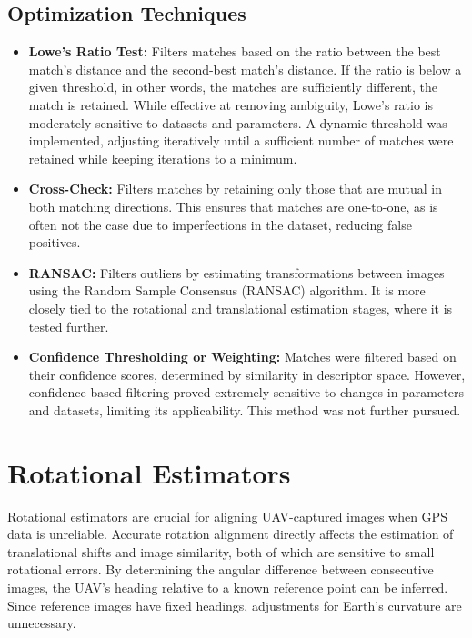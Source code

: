 \subsection*{Optimization Techniques}
\begin{itemize}
    \item \textbf{Lowe’s Ratio Test:}  
    Filters matches based on the ratio between the best match’s distance and the second-best match’s distance. If the ratio is below a given threshold, in other words, the matches are sufficiently different, the match is retained. While effective at removing ambiguity, Lowe’s ratio is moderately sensitive to datasets and parameters. A dynamic threshold was implemented, adjusting iteratively until a sufficient number of matches were retained while keeping iterations to a minimum.

    \item \textbf{Cross-Check:}  
    Filters matches by retaining only those that are mutual in both matching directions. This ensures that matches are one-to-one, as is often not the case due to imperfections in the dataset, reducing false positives.

    \item \textbf{RANSAC:}  
    Filters outliers by estimating transformations between images using the Random Sample Consensus (RANSAC) algorithm. It is more closely tied to the rotational and translational estimation stages, where it is tested further.

    \item \textbf{Confidence Thresholding or Weighting:}  
    Matches were filtered based on their confidence scores, determined by similarity in descriptor space. However, confidence-based filtering proved extremely sensitive to changes in parameters and datasets, limiting its applicability. This method was not further pursued.
\end{itemize}



\section*{Rotational Estimators}

Rotational estimators are crucial for aligning UAV-captured images when GPS data is unreliable. Accurate rotation alignment directly affects the estimation of translational shifts and image similarity, both of which are sensitive to small rotational errors. By determining the angular difference between consecutive images, the UAV's heading relative to a known reference point can be inferred. Since reference images have fixed headings, adjustments for Earth's curvature are unnecessary.

